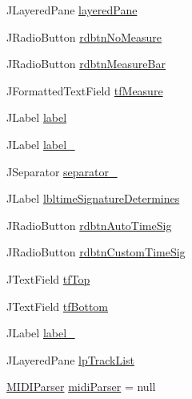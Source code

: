 \begin{DoxyCompactItemize}
\item 
J\+Layered\+Pane \hyperlink{classcom_1_1lclion_1_1midigui_1_1_dialog_track_import_a90de2803c72845b70771d7326d038f45}{layered\+Pane}
\item 
J\+Radio\+Button \hyperlink{classcom_1_1lclion_1_1midigui_1_1_dialog_track_import_a4a8eba2702fef7e4d27fa65343a9c637}{rdbtn\+No\+Measure}
\item 
J\+Radio\+Button \hyperlink{classcom_1_1lclion_1_1midigui_1_1_dialog_track_import_a541603f796912a6a5e40a885d18c2b6d}{rdbtn\+Measure\+Bar}
\item 
J\+Formatted\+Text\+Field \hyperlink{classcom_1_1lclion_1_1midigui_1_1_dialog_track_import_a6cc62464f9541b65d27a3a7a2ccdcc7b}{tf\+Measure}
\item 
J\+Label \hyperlink{classcom_1_1lclion_1_1midigui_1_1_dialog_track_import_ac12cbe37671cd5915541509460b6c16d}{label}
\item 
J\+Label \hyperlink{classcom_1_1lclion_1_1midigui_1_1_dialog_track_import_a8e0e71bac1a2f7dc57eee4c2bdb3b4c8}{label\+\_}
\item 
J\+Separator \hyperlink{classcom_1_1lclion_1_1midigui_1_1_dialog_track_import_aa3830aae8fa2c36c0acbe8dfb03688bb}{separator\+\_}
\item 
J\+Label \hyperlink{classcom_1_1lclion_1_1midigui_1_1_dialog_track_import_a55a5f9a736ca9e5564e99a75475f665e}{lbltime\+Signature\+Determines}
\item 
J\+Radio\+Button \hyperlink{classcom_1_1lclion_1_1midigui_1_1_dialog_track_import_aa403bc56221bd1af763dbf31f90a8902}{rdbtn\+Auto\+Time\+Sig}
\item 
J\+Radio\+Button \hyperlink{classcom_1_1lclion_1_1midigui_1_1_dialog_track_import_ad09e056f314ee875a2c70236299d5633}{rdbtn\+Custom\+Time\+Sig}
\item 
J\+Text\+Field \hyperlink{classcom_1_1lclion_1_1midigui_1_1_dialog_track_import_a1df6442c69813ef29777fef773a4c0f9}{tf\+Top}
\item 
J\+Text\+Field \hyperlink{classcom_1_1lclion_1_1midigui_1_1_dialog_track_import_ad2edc1b54d80700468be7da4535d3fc3}{tf\+Bottom}
\item 
J\+Label \hyperlink{classcom_1_1lclion_1_1midigui_1_1_dialog_track_import_a7f6cf2680790da7a8524b4fd64c9f04d}{label\+\_}
\item 
J\+Layered\+Pane \hyperlink{classcom_1_1lclion_1_1midigui_1_1_dialog_track_import_a355d53023163856ae9e762dffc32d9e0}{lp\+Track\+List}
\item 
\hyperlink{classcom_1_1lclion_1_1midiparser_1_1_m_i_d_i_parser}{M\+I\+D\+I\+Parser} \hyperlink{classcom_1_1lclion_1_1midigui_1_1_dialog_track_import_aba18751017d64d85cea94d280c8e9dc0}{midi\+Parser} = null

\end{DoxyCompactItemize}
